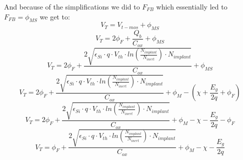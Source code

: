 And because of the simplifications we did to $F_{FB}$ which essentially led to $F_{FB}=\phi_{MS}$ we get to:
\begin{equation}
V_T = V_{t-mos} + \phi_{MS}
\end{equation}
\begin{equation}
V_T = 2 \phi_F + \frac{Q_b}{C_{ox}} + \phi_{MS}
\end{equation}
\begin{equation}
V_T = 2 \phi_F + \frac{2 \sqrt{\epsilon_{Si}\cdot q\cdot V_{th}\cdot ln\left(\frac{N_{implant}}{N_{inert}}\right) \cdot N_{implant} }}{C_{ox}} + \phi_{MS}
\end{equation}
\begin{equation}
V_T = 2 \phi_F + \frac{2 \sqrt{\epsilon_{Si}\cdot q\cdot V_{th}\cdot ln\left(\frac{N_{implant}}{N_{inert}}\right) \cdot N_{implant} }}{C_{ox}} + \phi_{M} -  \left(\chi + \frac{E_g}{2 q} + \phi_F \right)
\end{equation}
\begin{equation}
V_T = 2 \phi_F + \frac{2 \sqrt{\epsilon_{Si}\cdot q\cdot V_{th}\cdot ln\left(\frac{N_{implant}}{N_{inert}}\right) \cdot N_{implant} }}{C_{ox}} + \phi_{M} -  \chi - \frac{E_g}{2 q} - \phi_F
\end{equation}
\begin{equation}
V_T = \phi_F + \frac{2 \sqrt{\epsilon_{Si}\cdot q\cdot V_{th}\cdot ln\left(\frac{N_{implant}}{N_{inert}}\right) \cdot N_{implant} }}{C_{ox}} + \phi_{M} -  \chi - \frac{E_g}{2 q}
\end{equation}

